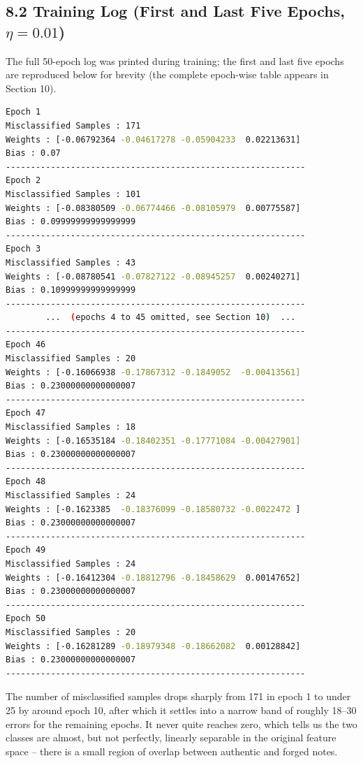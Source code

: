 \documentclass[11pt]{article}
\begin{document}
\subsection*{8.2 Training Log (First and Last Five Epochs, $\eta = 0.01$)}

The full 50-epoch log was printed during training; the first and last five epochs are reproduced below for brevity (the complete epoch-wise table appears in Section 10).

\begin{lstlisting}[language=bash, basicstyle=\ttfamily\scriptsize, frame=single, backgroundcolor=\color{codebg}]
Epoch 1
Misclassified Samples : 171
Weights : [-0.06792364 -0.04617278 -0.05904233  0.02213631]
Bias : 0.07
------------------------------------------------------------
Epoch 2
Misclassified Samples : 101
Weights : [-0.08380509 -0.06774466 -0.08105979  0.00775587]
Bias : 0.09999999999999999
------------------------------------------------------------
Epoch 3
Misclassified Samples : 43
Weights : [-0.08780541 -0.07827122 -0.08945257  0.00240271]
Bias : 0.10999999999999999
------------------------------------------------------------
        ...  (epochs 4 to 45 omitted, see Section 10)  ...
------------------------------------------------------------
Epoch 46
Misclassified Samples : 20
Weights : [-0.16066938 -0.17867312 -0.1849052  -0.00413561]
Bias : 0.23000000000000007
------------------------------------------------------------
Epoch 47
Misclassified Samples : 18
Weights : [-0.16535184 -0.18402351 -0.17771084 -0.00427901]
Bias : 0.23000000000000007
------------------------------------------------------------
Epoch 48
Misclassified Samples : 24
Weights : [-0.1623385  -0.18376099 -0.18580732 -0.0022472 ]
Bias : 0.23000000000000007
------------------------------------------------------------
Epoch 49
Misclassified Samples : 24
Weights : [-0.16412304 -0.18812796 -0.18458629  0.00147652]
Bias : 0.23000000000000007
------------------------------------------------------------
Epoch 50
Misclassified Samples : 20
Weights : [-0.16281289 -0.18979348 -0.18662082  0.00128842]
Bias : 0.23000000000000007
------------------------------------------------------------
\end{lstlisting}

The number of misclassified samples drops sharply from 171 in epoch 1 to under 25 by around epoch 10, after which it settles into a narrow band of roughly 18--30 errors for the remaining epochs. It never quite reaches zero, which tells us the two classes are almost, but not perfectly, linearly separable in the original feature space -- there is a small region of overlap between authentic and forged notes.
\end{document}
